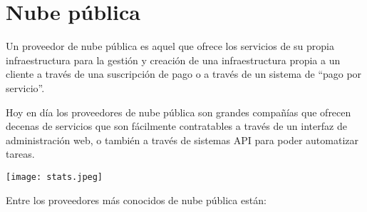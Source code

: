 \section{Nube pública}

Un proveedor de nube pública es aquel que ofrece los servicios de su propia infraestructura para la gestión y creación de una infraestructura propia a un cliente a través de una suscripción de pago o a través de un sistema de “pago por servicio”.

Hoy en día los proveedores de nube pública son grandes compañías que ofrecen decenas de servicios que son fácilmente contratables a través de un interfaz de administración web, o también a través de sistemas API para poder automatizar tareas.

\begin{center}
	\texttt{[image: stats.jpeg]}
\end{center}


Entre los proveedores más conocidos de nube pública están:

